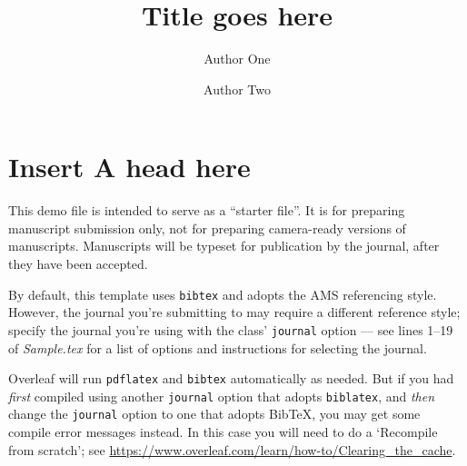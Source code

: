 \documentclass[journal=eds]{CAM-MODERN}%
\theoremstyle{definition}
\numberwithin{equation}{section}
\begin{document}
\begin{Frontmatter}

\title[Short Title]{Title goes here}

\author[1]{Author One}
\author[2]{Author Two}

\address[1]{Department, University, Country}
\address[2]{Department, University, Country}




\end{Frontmatter}

\clearpage
\linenumbers

\section{Insert A head here}
This demo file is intended to serve as a ``starter file''. It is for preparing manuscript submission only, not for preparing camera-ready versions of manuscripts. Manuscripts will be typeset for publication by the journal, after they have been accepted.

By default, this template uses \texttt{bibtex} and adopts the AMS referencing style. However, the journal you’re submitting to may require a different reference style; specify the journal you're using with the class' \texttt{journal} option --- see lines 1--19 of \emph{Sample.tex} for a list of options and instructions for selecting the journal. 

Overleaf will run \texttt{pdflatex} and \texttt{bibtex} automatically as needed. But if you had \emph{first} compiled using another \texttt{journal} option that adopts \texttt{biblatex}, and \emph{then} change the \texttt{journal} option to one that adopts Bib\TeX{}, you may get some compile error messages instead. In this case you will need to do a `Recompile from scratch'; see \url{https://www.overleaf.com/learn/how-to/Clearing_the_cache}.
\end{document}

